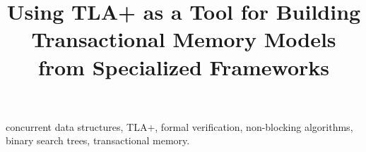 \documentclass[conference]{IEEEtran}
\begin{document}
\title{Using TLA+ as a Tool for Building Transactional Memory Models from Specialized Frameworks}
\author{
}
\maketitle



\begin{IEEEkeywords}
concurrent data structures, TLA+, formal verification, non-blocking algorithms, binary search trees, transactional memory.
\end{IEEEkeywords}


















\end{document}
